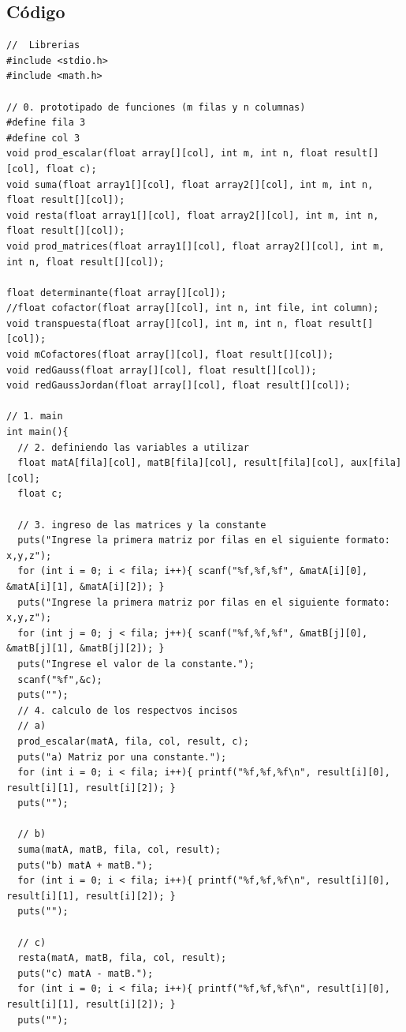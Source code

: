 \subsection{Código}
\begin{lstlisting}
//	Librerias
#include <stdio.h>
#include <math.h>

// 0. prototipado de funciones (m filas y n columnas)
#define fila 3
#define col 3
void prod_escalar(float array[][col], int m, int n, float result[][col], float c);
void suma(float array1[][col], float array2[][col], int m, int n, float result[][col]);
void resta(float array1[][col], float array2[][col], int m, int n, float result[][col]);
void prod_matrices(float array1[][col], float array2[][col], int m, int n, float result[][col]);

float determinante(float array[][col]);
//float cofactor(float array[][col], int n, int file, int column);
void transpuesta(float array[][col], int m, int n, float result[][col]);
void mCofactores(float array[][col], float result[][col]);
void redGauss(float array[][col], float result[][col]);
void redGaussJordan(float array[][col], float result[][col]);

// 1. main
int main(){
  // 2. definiendo las variables a utilizar
  float matA[fila][col], matB[fila][col], result[fila][col], aux[fila][col];
  float c;

  // 3. ingreso de las matrices y la constante
  puts("Ingrese la primera matriz por filas en el siguiente formato: x,y,z");
  for (int i = 0; i < fila; i++){ scanf("%f,%f,%f", &matA[i][0], &matA[i][1], &matA[i][2]); }
  puts("Ingrese la primera matriz por filas en el siguiente formato: x,y,z");
  for (int j = 0; j < fila; j++){ scanf("%f,%f,%f", &matB[j][0], &matB[j][1], &matB[j][2]); }
  puts("Ingrese el valor de la constante.");
  scanf("%f",&c);
  puts("");
  // 4. calculo de los respectvos incisos
  // a)
  prod_escalar(matA, fila, col, result, c);
  puts("a) Matriz por una constante.");
  for (int i = 0; i < fila; i++){ printf("%f,%f,%f\n", result[i][0], result[i][1], result[i][2]); }
  puts("");

  // b)
  suma(matA, matB, fila, col, result);
  puts("b) matA + matB.");
  for (int i = 0; i < fila; i++){ printf("%f,%f,%f\n", result[i][0], result[i][1], result[i][2]); }
  puts("");

  // c)
  resta(matA, matB, fila, col, result);
  puts("c) matA - matB.");
  for (int i = 0; i < fila; i++){ printf("%f,%f,%f\n", result[i][0], result[i][1], result[i][2]); }
  puts("");


\end{lstlisting}
